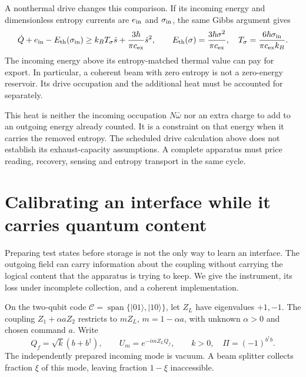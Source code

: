 \documentclass[aps,pre,onecolumn,superscriptaddress,floatfix,longbibliography]{revtex4-2}
\begin{document}
A nonthermal drive changes this comparison. If its incoming energy and
dimensionless entropy currents are $e_{\rm in}$ and $\sigma_{\rm in}$, the
same Gibbs argument gives
\[
 \dot Q+e_{\rm in}-E_{\rm th}(\sigma_{\rm in})
 \ge k_BT_\sigma\dot s+\frac{3\hbar}{\pi c_{\rm ex}}\dot s^2,\qquad
 E_{\rm th}(\sigma)=\frac{3\hbar\sigma^2}{\pi c_{\rm ex}},\quad
 T_\sigma=\frac{6\hbar\sigma_{\rm in}}{\pi c_{\rm ex}k_B}.
\]
The incoming energy above its entropy-matched thermal value can pay for export.
In particular, a coherent beam with zero entropy is not a zero-energy reservoir.
Its drive occupation and the additional heat must be accounted for separately.

This heat is neither the incoming occupation $N\bar\omega$ nor an extra charge
to add to an outgoing energy already counted. It is a constraint on that energy
when it carries the removed entropy. The scheduled drive calculation above does
not establish its exhaust-capacity assumptions. A complete apparatus must price
reading, recovery, sensing and entropy transport in the same cycle.

\section{Calibrating an interface while it carries quantum content}
\label{sec:held-content}

Preparing test states before storage is not the only way to learn an interface.
The outgoing field can carry information about the coupling without carrying
the logical content that the apparatus is trying to keep. We give the instrument,
its loss under incomplete collection, and a coherent implementation.

On the two-qubit code $\mathcal C=\operatorname{span}\{|01\rangle,|10\rangle\}$,
let $Z_L$ have eigenvalues $+1,-1$. The coupling
$Z_1+\alpha aZ_2$ restricts to $mZ_L$, $m=1-\alpha a$, with unknown
$\alpha>0$ and chosen command $a$. Write
\[
 Q_f=\sqrt{k}(b+b^\dagger),\qquad U_m=e^{-imZ_LQ_f},\qquad
 k>0,\quad \Pi=(-1)^{b^\dagger b}.
\]
The independently prepared incoming mode is vacuum. A beam splitter collects
fraction $\xi$ of this mode, leaving fraction $1-\xi$ inaccessible.
\end{document}
